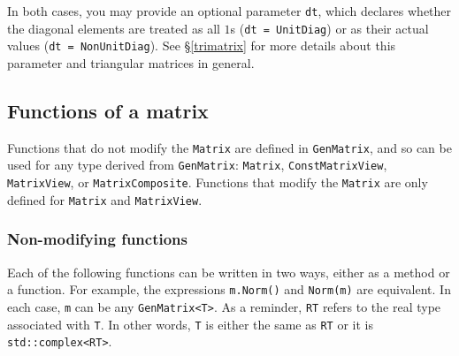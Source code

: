 \documentclass[twoside,letterpaper,11pt]{article}
\renewcommand{\tt}[1]{{\texttt {#1}}}
\begin{document}
\begin{itemize}
In both cases, you may provide an optional parameter \tt{dt}, which
declares whether the diagonal elements are treated as all $1$s
(\tt{dt = UnitDiag}) or as their actual values (\tt{dt = NonUnitDiag}). 
See \S\ref{trimatrix} for more details about this parameter and
triangular matrices in general.

\end{itemize}

\subsection{Functions of a matrix}

Functions that do not modify the \tt{Matrix} are defined in 
\tt{GenMatrix}, and so can be used for any type derived from \tt{GenMatrix}:
\tt{Matrix}, \tt{ConstMatrixView}, \tt{MatrixView}, or \tt{MatrixComposite}.
Functions that modify the \tt{Matrix} are only defined for 
\tt{Matrix} and \tt{MatrixView}.

\subsubsection{Non-modifying functions}

Each of the following functions can be written in two ways,
either as a method or a function.
For example, the expressions \tt{m.Norm()} and \tt{Norm(m)}
are equivalent.  
In each case, \tt{m} can be any \tt{GenMatrix<T>}.
As a reminder, \tt{RT} refers to the real type associated with \tt{T}.
In other words, \tt{T} is either the same as \tt{RT} or it is
\tt{std::complex<RT>}.
\end{document}
